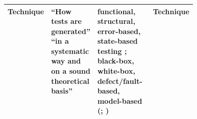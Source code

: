 \begin{table}[hbtp!]
\begin{tabularx}{\linewidth}{|c|X|m{0.33\linewidth}|m{0.1\linewidth}|}
        Technique                    & ``How tests are
        generated'' \cite[p.~ 88]{SWEBOK2014} ``in a systematic way and on a sound theoretical basis''
        \cite[p.~3]{BarbosaEtAl2006} & functional,
        structural, error-based, state-based testing \cite[p.~3]{BarbosaEtAl2006};
        black-box, white-box, defect/fault-based, model-based
        (\citealp[p.~3]{SouzaEtAl2017}; \citealp[pp.~88, 90-91]{SWEBOK2014})
                                     & Technique                                                     \\
        \hline
    \end{tabularx}
\end{table}

